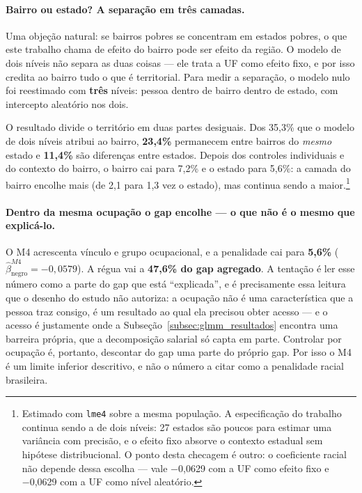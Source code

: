 \documentclass[12pt, a4paper, oneside]{article}
\begin{document}
\paragraph{Bairro ou estado? A separação em três camadas.}
Uma objeção natural: se bairros pobres se concentram em estados pobres, o que este
trabalho chama de efeito do bairro pode ser efeito da região. O modelo de dois
níveis não separa as duas coisas --- ele trata a UF como efeito fixo, e por isso
credita ao bairro tudo o que é territorial. Para medir a separação, o modelo nulo
foi reestimado com \textbf{três} níveis: pessoa dentro de bairro dentro de estado,
com intercepto aleatório nos dois.

O resultado divide o território em duas partes desiguais. Dos
35,3\% que o modelo de dois níveis atribui ao bairro,
\textbf{23,4\%} permanecem entre bairros do \emph{mesmo} estado e
\textbf{11,4\%} são diferenças entre estados. Depois dos controles
individuais e do contexto do bairro, o bairro cai para 7,2\% e o estado
para 5,6\%: a camada do bairro encolhe mais (de 2,1 para 1,3 vez o estado), mas continua sendo a maior.\footnote{Estimado com \texttt{lme4} sobre a mesma população. A especificação do trabalho continua sendo a de dois níveis: 27 estados são poucos para estimar uma variância com precisão, e o efeito fixo absorve o contexto estadual sem hipótese distribucional. O ponto desta checagem é outro: o coeficiente racial não depende dessa escolha --- vale −0,0629 com a UF como efeito fixo e −0,0629 com a UF como nível aleatório.}


\paragraph{Dentro da mesma ocupação o gap encolhe --- o que não é o mesmo que explicá-lo.}
O M4 acrescenta vínculo e grupo ocupacional, e a penalidade cai para
\textbf{5,6\%} ($\hat\beta_{\text{negro}}^{M4} = −0,0579$). A régua vai a
\textbf{47,6\% do gap agregado}. A tentação é ler esse número como a parte do
gap que está ``explicada'', e é precisamente essa leitura que o desenho do estudo
não autoriza: a ocupação não é uma característica que a pessoa traz consigo, é um
resultado ao qual ela precisou obter acesso --- e o acesso é justamente onde a
Subseção~\ref{subsec:glmm_resultados} encontra uma barreira própria, que a decomposição
salarial só capta em parte. Controlar por
ocupação é, portanto, descontar do gap uma parte do próprio gap. Por isso o M4 é um
limite inferior descritivo, e não o número a citar como a penalidade racial brasileira.
\end{document}
